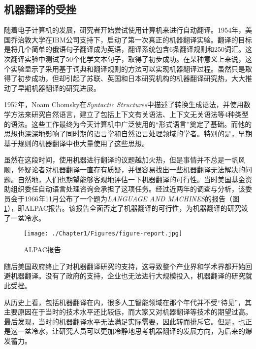 \subsection{机器翻译的受挫}

\parinterval 随着电子计算机的发展，研究者开始尝试使用计算机来进行自动翻译。1954年，美国乔治敦大学在IBM公司支持下，启动了第一次真正的机器翻译实验。翻译的目标是将几个简单的俄语句子翻译成为英语，翻译系统包含6条翻译规则和250词汇。这次翻译实验中测试了50个化学文本句子，取得了初步成功。在某种意义上来说，这个实验显示了采用基于词典和翻译规则的方法可以实现机器翻译过程。虽然只是取得了初步成功，但却引起了苏联、英国和日本研究机构的机器翻译研究热，大大推动了早期机器翻译的研究进展。

\parinterval 1957年，Noam Chomsky在\emph{Syntactic Structures}中描述了转换生成语法，并使用数学方法来研究自然语言，建立了包括上下文有关语法、上下文无关语法等4种类型的语法。这些工作最终为今天计算机中广泛使用的“形式语言”奠定了基础。而他的思想也深深地影响了同时期的语言学和自然语言处理领域的学者。特别的是，早期基于规则的机器翻译中也大量使用了这些思想。

\parinterval 虽然在这段时间，使用机器进行翻译的议题越加火热，但是事情并不总是一帆风顺，怀疑论者对机器翻译一直存有质疑，并很容易找出一些机器翻译无法解决的问题。自然地，人们也期望能够客观地评估一下机器翻译的可行性。当时美国基金资助组织委任自动语言处理咨询会承担了这项任务。经过近两年的调查与分析，该委员会于1966年11月公布了一个题为\emph{LANGUAGE AND MACHINES}的报告（图\ref{fig:1-4}），即ALPAC报告。该报告全面否定了机器翻译的可行性，为机器翻译的研究泼了一盆冷水。

\begin{figure}[htp]
    \centering
\texttt{[image: ./Chapter1/Figures/figure-report.jpg]}
    \caption{ALPAC报告}
    \label{fig:1-4}
\end{figure}

\parinterval 随后美国政府终止了对机器翻译研究的支持，这导致整个产业界和学术界都开始回避机器翻译。没有了政府的支持，企业也无法进行大规模投入，机器翻译的研究就此受挫。

\parinterval 从历史上看，包括机器翻译在内，很多人工智能领域在那个年代并不受“待见”，其主要原因在于当时的技术水平还比较低，而大家又对机器翻译等技术的期望过高。最后发现，当时的机器翻译水平无法满足实际需要，因此转而排斥它。但是，也正是这一盆冷水，让研究人员可以更加冷静地思考机器翻译的发展方向，为后来的爆发蓄力。


